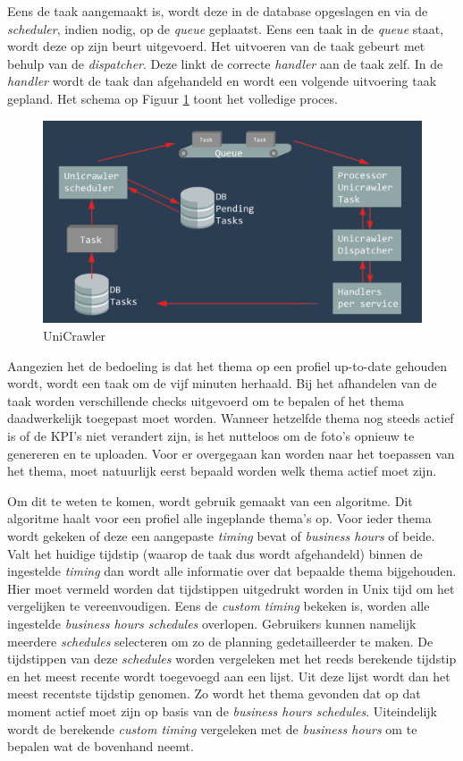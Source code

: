 Eens de taak aangemaakt is, wordt deze in de database opgeslagen en via de \textit{scheduler}, indien nodig, op de \textit{queue} geplaatst. Eens een taak in de \textit{queue} staat, wordt deze op zijn beurt uitgevoerd. Het uitvoeren van de taak gebeurt met behulp van de \textit{dispatcher}. Deze linkt de correcte \textit{handler} aan de taak zelf. In de \textit{handler} wordt de taak dan afgehandeld en wordt een volgende uitvoering taak gepland. Het schema op Figuur \ref{fig:UniCrawler} toont het volledige proces. 

\begin{figure}[H]
	\centering
	\includegraphics[width=1\textwidth]{Figuren/UniCrawler.png}
	\caption{UniCrawler}
	\label{fig:UniCrawler}
\end{figure}

Aangezien het de bedoeling is dat het thema op een profiel up-to-date gehouden wordt, wordt een taak om de vijf minuten herhaald. %
Bij het afhandelen van de taak worden verschillende checks uitgevoerd om te bepalen of het thema daadwerkelijk toegepast moet worden. Wanneer hetzelfde thema nog steeds actief is of de KPI's niet verandert zijn, is het nutteloos om de foto's opnieuw te genereren en te uploaden. Voor er overgegaan kan worden naar het toepassen van het thema, moet natuurlijk eerst bepaald worden welk thema actief moet zijn. 

Om dit te weten te komen, wordt gebruik gemaakt van een algoritme. Dit algoritme haalt voor een profiel alle ingeplande thema's op. Voor ieder thema wordt gekeken of deze een aangepaste \textit{timing} bevat of \textit{business hours} of beide. Valt het huidige tijdstip (waarop de taak dus wordt afgehandeld) binnen de ingestelde \textit{timing} dan wordt alle informatie over dat bepaalde thema bijgehouden. Hier moet vermeld worden dat tijdstippen uitgedrukt worden in Unix tijd om het vergelijken te vereenvoudigen. Eens de \textit{custom timing} bekeken is, worden alle ingestelde \textit{business hours schedules} overlopen. Gebruikers kunnen namelijk meerdere \textit{schedules} selecteren om zo de planning gedetailleerder te maken. De tijdstippen van deze \textit{schedules} worden vergeleken met het reeds berekende tijdstip en het meest recente wordt toegevoegd aan een lijst. Uit deze lijst wordt dan het meest recentste tijdstip genomen. Zo wordt het thema gevonden dat op dat moment actief moet zijn op basis van de \textit{business hours schedules}. Uiteindelijk wordt de berekende \textit{custom timing} vergeleken met de \textit{business hours} om te bepalen wat de bovenhand neemt. 


